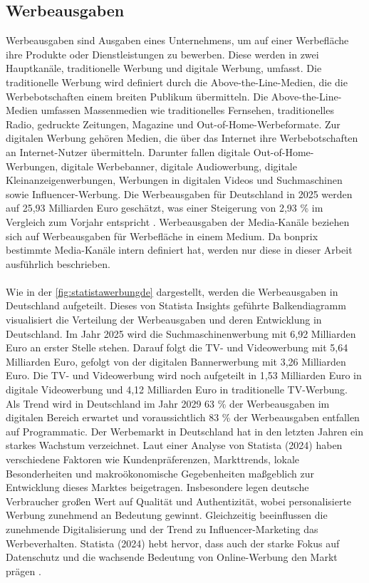 \subsection{Werbeausgaben}
\label{werbeausgaben}
Werbeausgaben sind Ausgaben eines Unternehmens, um auf einer Werbefläche ihre Produkte oder Dienstleistungen zu bewerben. Diese werden in zwei Hauptkanäle, traditionelle Werbung und digitale Werbung, umfasst. Die traditionelle Werbung wird definiert durch die Above-the-Line-Medien, die die Werbebotschaften einem breiten Publikum übermitteln. Die Above-the-Line-Medien umfassen Massenmedien wie traditionelles Fernsehen, traditionelles Radio, gedruckte Zeitungen, Magazine und Out-of-Home-Werbeformate. Zur digitalen Werbung gehören Medien, die über das Internet ihre Werbebotschaften an Internet-Nutzer übermitteln. Darunter fallen digitale Out-of-Home-Werbungen, digitale Werbebanner, digitale Audiowerbung, digitale Kleinanzeigenwerbungen, Werbungen in digitalen Videos und Suchmaschinen sowie Influencer-Werbung. Die Werbeausgaben für Deutschland in 2025 werden auf 25,93 Milliarden Euro geschätzt, was einer Steigerung von 2,93 \% im Vergleich zum Vorjahr entspricht \cite{statista_werbung}. Werbeausgaben der Media-Kanäle beziehen sich auf Werbeausgaben für Werbefläche in einem Medium. Da bonprix bestimmte Media-Kanäle intern definiert hat, werden nur diese in dieser Arbeit ausführlich beschrieben. \\\\ 
Wie in der \autoref{fig:statistawerbungde} dargestellt, werden die Werbeausgaben in Deutschland aufgeteilt. Dieses von Statista Insights geführte Balkendiagramm visualisiert die Verteilung der Werbeausgaben und deren Entwicklung in Deutschland. Im Jahr 2025 wird die Suchmaschinenwerbung mit 6,92 Milliarden Euro an erster Stelle stehen. Darauf folgt die TV- und Videowerbung mit 5,64 Milliarden Euro, gefolgt von der digitalen Bannerwerbung mit 3,26 Milliarden Euro. Die TV- und Videowerbung wird noch aufgeteilt in 1,53 Milliarden Euro in digitale Videowerbung und 4,12 Milliarden Euro in traditionelle TV-Werbung. Als Trend wird in Deutschland im Jahr 2029 63 \% der Werbeausgaben im digitalen Bereich erwartet und voraussichtlich 83 \% der Werbeausgaben entfallen auf Programmatic. Der Werbemarkt in Deutschland hat in den letzten Jahren ein starkes Wachstum verzeichnet. Laut einer Analyse von Statista (2024) haben verschiedene Faktoren wie Kundenpräferenzen, Markttrends, lokale Besonderheiten und makroökonomische Gegebenheiten maßgeblich zur Entwicklung dieses Marktes beigetragen. Insbesondere legen deutsche Verbraucher großen Wert auf Qualität und Authentizität, wobei personalisierte Werbung zunehmend an Bedeutung gewinnt. Gleichzeitig beeinflussen die zunehmende Digitalisierung und der Trend zu Influencer-Marketing das Werbeverhalten. Statista (2024) hebt hervor, dass auch der starke Fokus auf Datenschutz und die wachsende Bedeutung von Online-Werbung den Markt prägen \cite{statista_werbung}.
